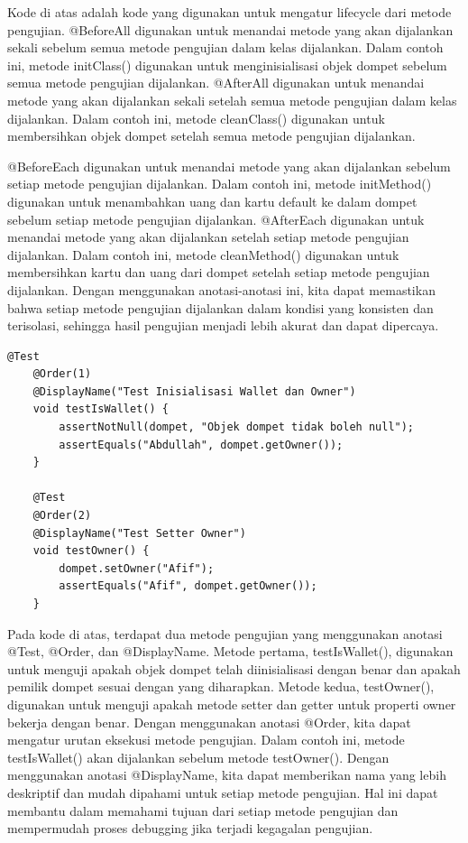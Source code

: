 \documentclass[a4paper,12pt]{article}
\begin{document}
Kode di atas adalah kode yang digunakan untuk mengatur lifecycle dari metode pengujian. @BeforeAll digunakan untuk menandai metode yang akan dijalankan sekali sebelum semua metode pengujian dalam kelas dijalankan. Dalam contoh ini, metode initClass() digunakan untuk menginisialisasi objek dompet sebelum semua metode pengujian dijalankan. @AfterAll digunakan untuk menandai metode yang akan dijalankan sekali setelah semua metode pengujian dalam kelas dijalankan. Dalam contoh ini, metode cleanClass() digunakan untuk membersihkan objek dompet setelah semua metode pengujian dijalankan. 

@BeforeEach digunakan untuk menandai metode yang akan dijalankan sebelum setiap metode pengujian dijalankan. Dalam contoh ini, metode initMethod() digunakan untuk menambahkan uang dan kartu default ke dalam dompet sebelum setiap metode pengujian dijalankan. @AfterEach digunakan untuk menandai metode yang akan dijalankan setelah setiap metode pengujian dijalankan. Dalam contoh ini, metode cleanMethod() digunakan untuk membersihkan kartu dan uang dari dompet setelah setiap metode pengujian dijalankan. Dengan menggunakan anotasi-anotasi ini, kita dapat memastikan bahwa setiap metode pengujian dijalankan dalam kondisi yang konsisten dan terisolasi, sehingga hasil pengujian menjadi lebih akurat dan dapat dipercaya.

\begin{lstlisting}[style=javastyle]
    @Test
    @Order(1)
    @DisplayName("Test Inisialisasi Wallet dan Owner")
    void testIsWallet() {
        assertNotNull(dompet, "Objek dompet tidak boleh null");
        assertEquals("Abdullah", dompet.getOwner());
    }

    @Test
    @Order(2)
    @DisplayName("Test Setter Owner")
    void testOwner() {
        dompet.setOwner("Afif");
        assertEquals("Afif", dompet.getOwner());
    }
\end{lstlisting}

Pada kode di atas, terdapat dua metode pengujian yang menggunakan anotasi @Test, @Order, dan @DisplayName. Metode pertama, testIsWallet(), digunakan untuk menguji apakah objek dompet telah diinisialisasi dengan benar dan apakah pemilik dompet sesuai dengan yang diharapkan. Metode kedua, testOwner(), digunakan untuk menguji apakah metode setter dan getter untuk properti owner bekerja dengan benar. Dengan menggunakan anotasi @Order, kita dapat mengatur urutan eksekusi metode pengujian. Dalam contoh ini, metode testIsWallet() akan dijalankan sebelum metode testOwner(). Dengan menggunakan anotasi @DisplayName, kita dapat memberikan nama yang lebih deskriptif dan mudah dipahami untuk setiap metode pengujian. Hal ini dapat membantu dalam memahami tujuan dari setiap metode pengujian dan mempermudah proses debugging jika terjadi kegagalan pengujian.
\end{document}
